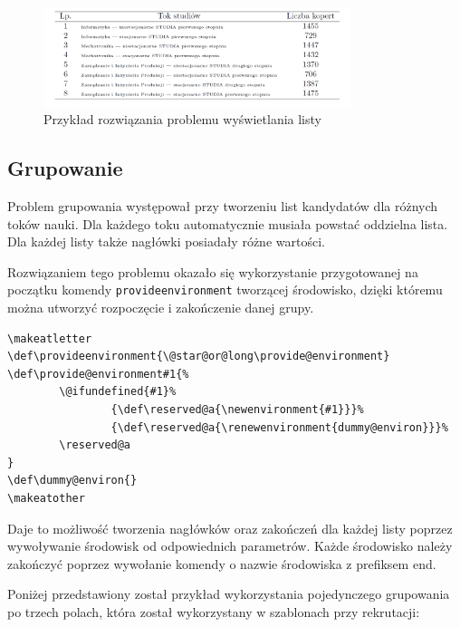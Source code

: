 \begin{figure}[h]
    \centering
      \includegraphics[width=0.8\textwidth]{rys/szablony/lista.png}
    \caption{Przykład rozwiązania problemu wyświetlania listy}
     \label{fig:lista}
\end{figure}

\subsection{Grupowanie}

Problem grupowania występował przy tworzeniu list kandydatów dla różnych toków nauki. Dla każdego toku automatycznie musiała powstać oddzielna lista. Dla każdej listy także nagłówki posiadały różne wartości. 
\par Rozwiązaniem tego problemu okazało się wykorzystanie przygotowanej na początku komendy \texttt{provideenvironment} tworzącej środowisko, dzięki któremu można utworzyć rozpoczęcie i zakończenie danej grupy. 
\begin{lstlisting}
\makeatletter
\def\provideenvironment{\@star@or@long\provide@environment}
\def\provide@environment#1{%
        \@ifundefined{#1}%
                {\def\reserved@a{\newenvironment{#1}}}%
                {\def\reserved@a{\renewenvironment{dummy@environ}}}%
        \reserved@a
}
\def\dummy@environ{}
\makeatother
\end{lstlisting}
Daje to możliwość tworzenia nagłówków oraz zakończeń dla każdej listy poprzez wywoływanie środowisk od odpowiednich parametrów. Każde środowisko należy zakończyć poprzez wywołanie komendy o nazwie środowiska z prefiksem end.
\vspace{5mm}
\par
Poniżej przedstawiony został przykład wykorzystania pojedynczego grupowania po trzech polach, która został wykorzystany w szablonach przy rekrutacji:

